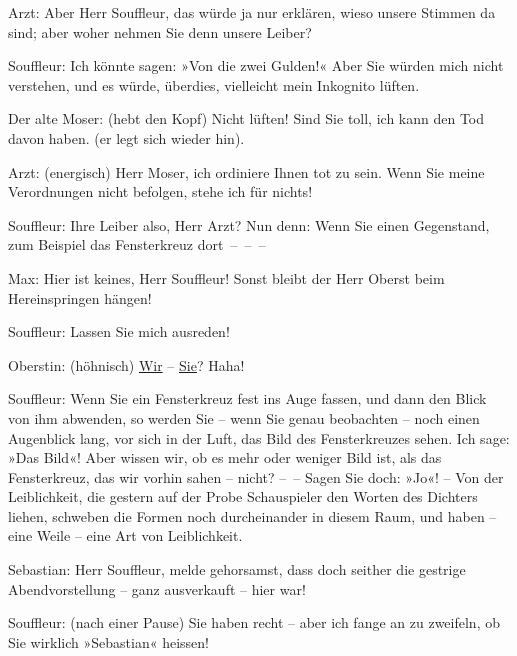 \pstart
           Arzt: Aber Herr Souffleur, das würde ja nur erklären, wieso unsere Stimmen da sind;
               aber woher nehmen Sie denn unsere Leiber?\pend
           
\pstart
           Souffleur: Ich könnte sagen: »Von die zwei Gulden!« Aber Sie würden mich nicht
               verstehen, und es würde, überdies, vielleicht mein Inkognito lüften.\pend
           
\pstart
           Der alte Moser: (hebt den Kopf) Nicht lüften! Sind Sie toll, ich kann den Tod davon
               haben. (er legt sich wieder hin).\pend
           
\pstart
           Arzt: (energisch) Herr Moser, ich ordiniere Ihnen tot zu sein. Wenn Sie meine
               Verordnungen nicht befolgen, stehe ich für nichts!\pend
           
\pstart
           Souffleur: Ihre Leiber also, Herr Arzt? Nun denn: Wenn Sie einen Gegenstand, zum
               Beispiel das Fensterkreuz dort – – –\pend
           
\pstart
           Max: Hier ist keines, Herr Souffleur! Sonst bleibt der Herr Oberst beim
               Hereinspringen hängen!\pend
           
\pstart
           {\pb}Souffleur: Lassen Sie mich
               ausreden!\pend
           
\pstart
           Oberstin: (höhnisch) \uline{Wir} – \uline{Sie}? Haha!\pend
           
\pstart
           Souffleur: Wenn Sie ein Fensterkreuz fest ins Auge fassen, und dann den Blick von ihm
               abwenden, so werden Sie – wenn Sie genau beobachten – noch einen Augenblick lang, vor
               sich in der Luft, das Bild des Fensterkreuzes sehen. Ich sage: »Das Bild«! Aber
               wissen wir, ob es mehr oder weniger Bild ist, als das Fensterkreuz, das wir vorhin
               sahen – nicht? – – Sagen Sie doch: »Jo«! – Von der Leiblichkeit, die gestern auf der
               Probe Schauspieler den Worten des Dichters liehen, schweben die Formen noch
               durcheinander in diesem Raum, und haben – eine Weile – eine Art von Leiblichkeit.\pend
           
\pstart
           Sebastian: Herr Souffleur, melde gehorsamst, dass doch seither die gestrige
               Abendvorstellung – ganz ausverkauft – hier war!\pend
           
\pstart
           Souffleur: (nach einer Pause) Sie haben recht – aber ich fange an zu zweifeln, ob Sie
               wirklich »Sebastian« heissen!\pend
           
